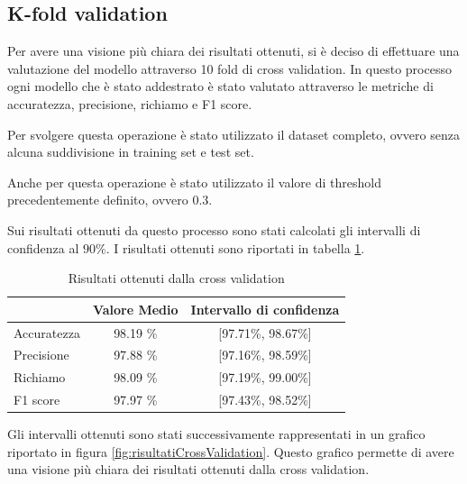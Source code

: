 \subsection*{K-fold validation}
Per avere una visione più chiara dei risultati ottenuti, si è deciso di effettuare
una valutazione del modello attraverso 10 fold di cross validation. In questo
processo ogni modello che è stato addestrato è stato valutato attraverso le
metriche di accuratezza, precisione, richiamo e F1 score.

Per svolgere questa operazione è stato utilizzato il dataset completo, ovvero
senza alcuna suddivisione in training set e test set.

Anche per questa operazione è stato utilizzato il valore di threshold precedentemente
definito, ovvero $0.3$.

Sui risultati ottenuti da questo processo sono stati calcolati gli intervalli
di confidenza al $90\%$. I risultati ottenuti sono riportati in tabella
\ref{tab:risultatiCrossValidation}.

\begin{table}[ht]
    \centering
    \begin{tabular}{@{}lcc@{}}
        \toprule
        \rowcolor[HTML]{EFEFEF}
        \multicolumn{1}{c}{\cellcolor[HTML]{EFEFEF}\textbf{Metrica}} & \textbf{Valore Medio} & \textbf{Intervallo di confidenza} \\ \midrule
        Accuratezza                                                  & 98.19 \%              & [97.71\%, 98.67\%]                \\
        Precisione                                                   & 97.88 \%              & [97.16\%, 98.59\%]                \\
        Richiamo                                                     & 98.09 \%              & [97.19\%, 99.00\%]                \\
        F1 score                                                     & 97.97 \%              & [97.43\%, 98.52\%]                \\ \bottomrule
    \end{tabular}
    \caption{Risultati ottenuti dalla cross validation}
    \label{tab:risultatiCrossValidation}
\end{table}

Gli intervalli ottenuti sono stati successivamente rappresentati in un grafico
riportato in figura \ref{fig:risultatiCrossValidation}. Questo grafico permette
di avere una visione più chiara dei risultati ottenuti dalla cross validation.

